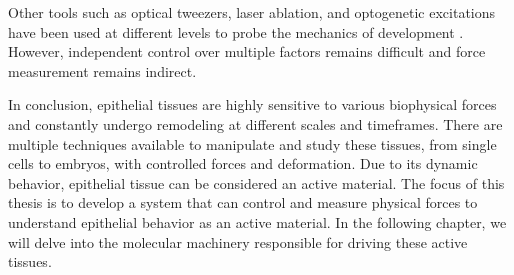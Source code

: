 Other tools such as optical tweezers, laser ablation, and optogenetic excitations have been used at different levels to probe the mechanics of development \cite{lecuit2011, gomez-gonzalez2020}. However, independent control over multiple factors remains difficult and force measurement remains indirect.

In conclusion, epithelial tissues are highly sensitive to various biophysical forces and constantly undergo remodeling at different scales and timeframes. There are multiple techniques available to manipulate and study these tissues, from single cells to embryos, with controlled forces and deformation. Due to its dynamic behavior, epithelial tissue can be considered an active material. The focus of this thesis is to develop a system that can control and measure physical forces to understand epithelial behavior as an active material. In the following chapter, we will delve into the molecular machinery responsible for driving these active tissues.